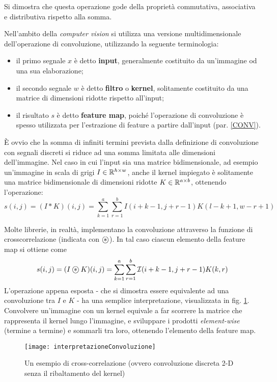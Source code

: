 Si dimostra che questa operazione gode della proprietà commutativa, associativa e distributiva rispetto alla somma.

Nell'ambito della \textit{computer vision} si utilizza una versione multidimensionale dell'operazione di convoluzione, utilizzando la seguente terminologia:
\begin{itemize}
\item il primo segnale $x$ è detto \textbf{input}, generalmente costituito da un'immagine od una sua elaborazione;
\item il secondo segnale $w$ è detto \textbf{filtro} o \textbf{kernel}, solitamente costituito da una matrice
di dimensioni ridotte rispetto all'input;
\item il risultato $s$ è detto \textbf{feature map}, poiché l'operazione di convoluzione è spesso utilizzata per l'estrazione di feature a partire dall'input (par. \ref{CONV}).
\end{itemize}
È ovvio che la somma di infiniti termini prevista dalla definizione di convoluzione con segnali discreti si riduce ad una somma limitata alle dimensioni dell'immagine. Nel caso in cui l'input sia una matrice bidimensionale, ad esempio un'immagine in scala di grigi $I\in\mathbb{R}^{h\times w}$, anche il kernel impiegato è solitamente una matrice bidimensionale di dimensioni ridotte $K\in\mathbb{R}^{a\times b}$, ottenendo l’operazione:
\begin{equation*}
s(i,j)=(I\ast K)(i,j)=\sum_{k=1}^a\sum_{r=1}^b I(i+k-1,j+r-1)K(l-k+1,w-r+1)
\end{equation*}

Molte librerie, in realtà, implementano la convoluzione attraverso la funzione di crosscorrelazione (indicata con $\oast$).
In tal caso ciascun elemento della feature map si ottiene come
\begin{equation*}
s(i,j)=(I\oast K)(i,j)=\sum_{k=1}^a\sum_{r=1}^b\mathcal{I}(i+k-1,j+r-1)K(k,r)
\end{equation*}
L'operazione appena esposta - che si dimostra essere equivalente ad una convoluzione tra $I$ e $K$ - ha una semplice interpretazione, visualizzata in fig. \ref{fig:interpretazioneConvoluzione}. Convolvere un'immagine con un kernel equivale a far scorrere la matrice che rappresenta il kernel lungo l'immagine, e sviluppare i prodotti \textit{element-wise} (termine a termine) e sommarli tra loro, ottenendo l'elemento della feature map.

\begin{figure}[h]
\centering
\texttt{[image: interpretazioneConvoluzione]}
\caption{Un esempio di cross-correlazione (ovvero convoluzione discreta 2-D senza il
ribaltamento del kernel)}
\label{fig:interpretazioneConvoluzione}
\end{figure}

